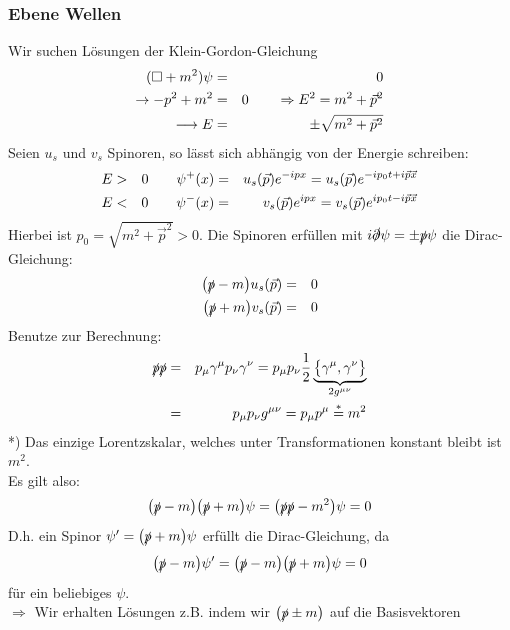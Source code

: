 \subsubsection{Ebene Wellen}
Wir suchen Lösungen der Klein-Gordon-Gleichung
\begin{eqnarray*} (\Box + m^2 ) \psi &=& 0\\
\rightarrow - p^2+ m^2&=&  0 \qquad \Rightarrow E^2 = m^2 + \vec p^2\\
\longrightarrow E &=& \pm \sqrt{m^2+ \vec p^2}
\end{eqnarray*}
Seien $u_s$ und $v_s$ Spinoren, so lässt sich abhängig von der Energie schreiben:
\begin{alignat*}{4}
E &>& 0 \qquad \psi^+ (x) &=& u_s(\vec p) e^{-ip x} = u_s(\vec p) e^{-ip_0t+i\vec p\vec x}\\
E &<& 0 \qquad \psi^- (x) &=&\  v_s(\vec p) e^{ip x} =v_s (\vec p) e^{ip_0t-i\vec p\vec x}
\end{alignat*}
Hierbei ist $p_0 = \sqrt{m^2+ \vec p^2} > 0$. Die Spinoren erfüllen mit $i\slashed{\partial} \psi = \pm \slashed p \psi$ die Dirac-Gleichung:
\begin{eqnarray*}
\big ( \slashed p - m \big ) u_s(\vec p) &=& 0\\
\big ( \slashed p + m \big ) v_s(\vec p) &=& 0
\end{eqnarray*}
Benutze zur Berechnung:
\begin{eqnarray*}
\slashed p \slashed p &=& p_{\mu}\gamma^{\mu} p_ \nu \gamma^\nu = p_\mu p_\nu \frac 1 2 \underbrace{\big\{\gamma^\mu,\gamma^\nu \big \}}_{2 g^{\mu \nu}}\\
&=& p_\mu p_\nu g^{\mu\nu} = p_\mu p^\mu \overset * = m^2
\end{eqnarray*}
*) Das einzige Lorentzskalar, welches unter Transformationen konstant bleibt ist $m^2$.\\
Es gilt also:
\begin{eqnarray*}
\big (\slashed p - m \big )\big(\slashed p + m \big) \psi = \big ( \slashed p \slashed p - m^2 \big ) \psi = 0
\end{eqnarray*} 
D.h. ein Spinor $\psi' = \big ( \slashed p + m \big ) \psi$ erfüllt die Dirac-Gleichung, da 
\begin{eqnarray*}\big(\slashed p - m \big ) \psi' = \big ( \slashed p - m \big) \big(\slashed p + m\big )\psi =0\end{eqnarray*}
 für ein beliebiges $\psi$.\\
$\Longrightarrow$ Wir erhalten Lösungen z.B. indem wir $\big (\slashed p \pm m \big)$ auf die Basisvektoren 

